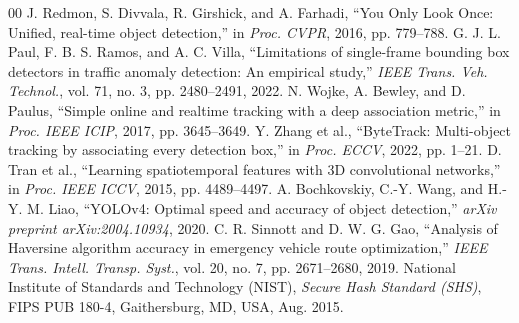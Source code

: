 \documentclass[conference]{IEEEtran}
\begin{document}
\begin{thebibliography}{00}
 J. Redmon, S. Divvala, R. Girshick, and A. Farhadi, ``You Only Look Once: Unified, real-time object detection,'' in \textit{Proc. CVPR}, 2016, pp. 779--788.
 G. J. L. Paul, F. B. S. Ramos, and A. C. Villa, ``Limitations of single-frame bounding box detectors in traffic anomaly detection: An empirical study,'' \textit{IEEE Trans. Veh. Technol.}, vol. 71, no. 3, pp. 2480--2491, 2022.
 N. Wojke, A. Bewley, and D. Paulus, ``Simple online and realtime tracking with a deep association metric,'' in \textit{Proc. IEEE ICIP}, 2017, pp. 3645--3649.
 Y. Zhang et al., ``ByteTrack: Multi-object tracking by associating every detection box,'' in \textit{Proc. ECCV}, 2022, pp. 1--21.
 D. Tran et al., ``Learning spatiotemporal features with 3D convolutional networks,'' in \textit{Proc. IEEE ICCV}, 2015, pp. 4489--4497.
 A. Bochkovskiy, C.-Y. Wang, and H.-Y. M. Liao, ``YOLOv4: Optimal speed and accuracy of object detection,'' \textit{arXiv preprint arXiv:2004.10934}, 2020.
 C. R. Sinnott and D. W. G. Gao, ``Analysis of Haversine algorithm accuracy in emergency vehicle route optimization,'' \textit{IEEE Trans. Intell. Transp. Syst.}, vol. 20, no. 7, pp. 2671--2680, 2019.
 National Institute of Standards and Technology (NIST), \textit{Secure Hash Standard (SHS)}, FIPS PUB 180-4, Gaithersburg, MD, USA, Aug. 2015.
\end{thebibliography}
\end{document}
